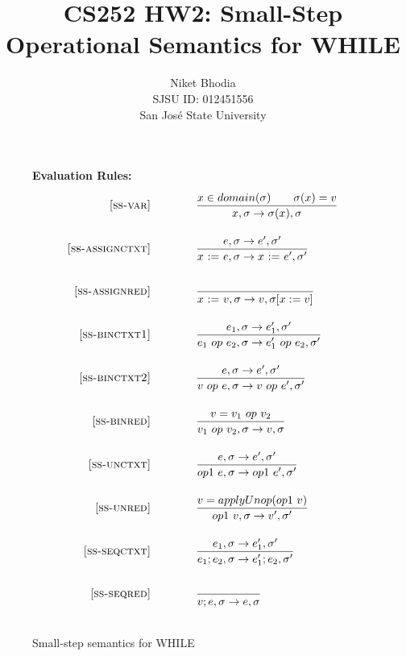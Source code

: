 \documentclass{article}
\title{CS252 HW2: Small-Step Operational Semantics for WHILE}
\author{
  Niket Bhodia \\
  SJSU ID: 012451556 \\
  San Jos\'{e} State University \\
  }
\date{}
\newcommand{\rel}[1]{ \mbox{\sc [#1]} }
\begin{document}
\maketitle

\newcommand{\mydefhead}[2]{\multicolumn{2}{l}{{#1}}&\mbox{\emph{#2}}\\}
\newcommand{\mydefcase}[2]{\qquad\qquad& #1 &\mbox{#2}\\}

\newcommand{\assign}[2]{#1~{:=}~#2}
\newcommand{\ife}[3]{\mbox{\tt if}~{#1}~\mbox{\tt then}~{#2}~\mbox{\tt else}~{#3}}
\newcommand{\whilee}[2]{\mbox{\tt while}~(#1)~#2}
\newcommand{\true}{\mbox{\tt true}}
\newcommand{\false}{\mbox{\tt false}}
\newcommand{\ssrule}[3]{
  \rel{#1} &
  \frac{\strut\begin{array}{@{}c@{}} #2 \end{array}}
       {\strut\begin{array}{@{}c@{}} #3 \end{array}}
   \\~\\
}
\newcommand{\sstep}[4]{{#1},{#2} \rightarrow {#3},{#4}}
\newcommand{\sstepraw}[4]{{#1},{#2} \rightarrow {#3},{#4}}
\newcommand{\ctxt}{C}
\newcommand{\bstep}[4]{{#1},{#2} \Downarrow {#3},{#4}}

\begin{figure}[H]\label{fig:smallstep}
\caption{Small-step semantics for WHILE}

{\bf Evaluation Rules:~~~ \fbox{$\sstepraw{e}{\sigma}{e'}{\sigma'}$}} \\
\[
\begin{array}{r@{\qquad\qquad}l}
\ssrule{ss-var}{
  x \in domain(\sigma) \qquad \sigma(x)=v
}{
  \sstep{x}{\sigma}{\sigma(x)}{\sigma}
}
\ssrule{ss-assignctxt}{
  \sstep{e}{\sigma}{e'}{\sigma'}
}{
  \sstep{\assign{x}{e}}{\sigma}{\assign{x}{e'}}{\sigma'}
}
\ssrule{ss-assignred}{
}{
  \sstep{\assign{x}{v}}{\sigma}{v}{\sigma[x:=v]}
}
\ssrule{ss-binctxt1}{
  \sstep{e_1}{\sigma}{e_1'}{\sigma'}
}{
  \sstep{e_1~op~e_2}{\sigma}{e_1'~op~e_2}{\sigma'}
}
\ssrule{ss-binctxt2}{
  \sstep{e}{\sigma}{e'}{\sigma'}
}{
  \sstep{v~op~e}{\sigma}{v~op~e'}{\sigma'}
}
\ssrule{ss-binred}{
  v = v_1 ~op~ v_2
}{
  \sstep{v_1~op~v_2}{\sigma}{v}{\sigma}
}
\ssrule{ss-unctxt}{
  \sstep{e}{\sigma}{e'}{\sigma'}
}{
  \sstep{op1~e}{\sigma}{op1~e'}{\sigma'}
}
\ssrule{ss-unred}{
  v = applyUnop (op1~v)
}{
  \sstep{op1~v}{\sigma}{v'}{\sigma'}
}
\ssrule{ss-seqctxt}{
  \sstep{e_1}{\sigma}{e_1'}{\sigma'}
}{
  \sstep{e_1;e_2}{\sigma}{e_1';e_2}{\sigma'}
}
\ssrule{ss-seqred}{
}{
  \sstep{v;e}{\sigma}{e}{\sigma}
}
\end{array}
\]
\end{figure}
\end{document}

